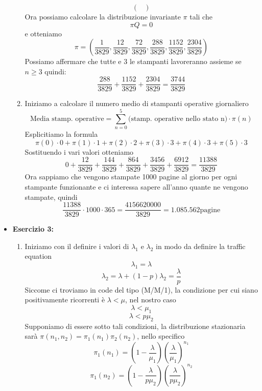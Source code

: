\documentclass[a4paper,12pt]{article}
\begin{document}
\begin{itemize}
\begin{enumerate}[label=\alph*)]
\[\begin{pmatrix}
			\end{pmatrix}
			\]
			Ora possiamo calcolare la distribuzione invariante $\pi$ tali che 
			\[
			\pi Q=0
			\]
			e otteniamo\\
			\[
			\pi=(\frac{1}{3829},\frac{12}{3829},\frac{72}{3829},\frac{288}{3829},\frac{1152}{3829},\frac{2304}{3829})
			\]
			Possiamo affermare che tutte e 3 le stampanti lavoreranno assieme se $n\geq 3$ quindi:\\
			\[
			\frac{288}{3829} +\frac{1152}{3829}+\frac{2304}{3829}=\frac{3744}{3829}
			\]
			\item Iniziamo a calcolare il numero medio di stampanti operative giornaliero\\
			\[\text{Media stamp. operative}=\sum_{n=0}^{5}\text{(stamp. operative nello stato n)}\cdot\pi(n)
			\]
			Esplicitiamo la formula\\
			\[
			 \pi(0) \cdot 0 + \pi(1) \cdot 1 + \pi(2) \cdot 2 + \pi(3) \cdot 3 + \pi(4) \cdot 3 + \pi(5) \cdot 3
			\]
			Sostituendo i vari valori otteniamo\\
			\[
			0+\frac{12}{3829}+\frac{144}{3829}+\frac{864}{3829}+\frac{3456}{3829}+\frac{6912}{3829}=\frac{11388}{3829}
			\]
			Ora sappiamo che vengono stampate 1000 pagine al giorno per ogni stampante funzionante e ci interessa sapere all'anno quante ne vengono stampate, quindi\\
			\[
			\frac{11388}{3829}\cdot1000\cdot365=\frac{4156620000}{3829}=1.085.562 \text{pagine}
			\]
		\end{enumerate}
		\newpage
		\item \textbf{Esercizio 3: }
		\begin{enumerate} [label=\alph*)]
			\item Iniziamo con il definire i valori di $\lambda_1$ e $\lambda_2$ in modo da definire la traffic equation\\
			\[
			\lambda_1 = \lambda 
			\]
			\[
			\lambda_2=\lambda + (1-p)\lambda_2=\frac{\lambda}{p}
			\]
			Siccome ci troviamo in code del tipo (M/M/1), la condizione per cui siano positivamente ricorrenti è $\lambda < \mu$, nel nostro caso\\
			\[
			\lambda < \mu_1
			\]
			\[
			\lambda < p\mu_2
			\]
			Supponiamo di essere sotto tali condizioni, la distribuzione stazionaria sarà $\pi(n_1,n_2)=\pi_1(n_1)\pi_2(n_2)$, nello specifico\\
			\[
			\pi_1(n_1) = \left( 1 - \frac{\lambda}{\mu_1} \right) \left( \frac{\lambda}{\mu_1} \right)^{n_1}
			\]
			\[
			\pi_1(n_2) = \left( 1 - \frac{\lambda}{p\mu_2} \right) \left( \frac{\lambda}{p\mu_2} \right)^{n_2}
\]
\end{enumerate}
\end{itemize}
\end{document}
